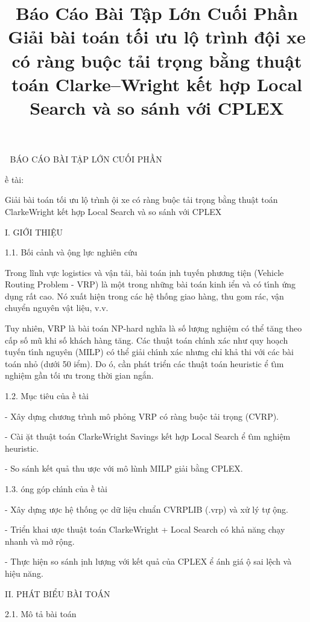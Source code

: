 \documentclass[12pt]{article}
\title{Báo Cáo Bài Tập Lớn Cuối Phần\\\large{Giải bài toán tối ưu lộ trình đội xe có ràng buộc tải trọng bằng thuật toán Clarke--Wright kết hợp Local Search và so sánh với CPLEX}}
\author{}
\date{}
\begin{document}
\maketitle
📘 B\'AO C\'AO B\`AI TẬP LỚN CUỐI PHẦN

{\DJ}ề t\`ai:

Giải b\`ai to\'an tối ưu lộ tr{\`\i}nh {\dj}ội xe c\'o r\`ang buộc tải trọng bằng thuật to\'an Clarke{\textendash}Wright kết hợp Local Search v\`a so s\'anh với CPLEX

I. GIỚI THIỆU

1.1. Bối cảnh v\`a {\dj}ộng lực nghi\^en cứu

Trong l\~{i}nh vực logistics v\`a vận tải, b\`ai to\'an {\dj}ịnh tuyến phương tiện (Vehicle Routing Problem - VRP) l\`a một trong những b\`ai to\'an kinh {\dj}iển v\`a c\'o t{\'\i}nh ứng dụng rất cao. N\'o xuất hiện trong c\'ac hệ thống giao h\`ang, thu gom r\'ac, vận chuyển nguy\^en vật liệu, v.v.

Tuy nhi\^en, VRP l\`a b\`ai to\'an NP-hard {\textemdash} ngh\~{i}a l\`a số lượng nghiệm c\'o thể t\u{a}ng theo cấp số m\~{u} khi số kh\'ach h\`ang t\u{a}ng. C\'ac thuật to\'an ch{\'\i}nh x\'ac như quy hoạch tuyến t{\'\i}nh nguy\^en (MILP) c\'o thể giải ch{\'\i}nh x\'ac nhưng chỉ khả thi với c\'ac b\`ai to\'an nhỏ (dưới 50 {\dj}iểm). Do {\dj}\'o, cần ph\'at triển c\'ac thuật to\'an heuristic {\dj}ể t{\`\i}m nghiệm gần tối ưu trong thời gian ngắn.

1.2. Mục ti\^eu của {\dj}ề t\`ai

- X\^ay dựng chương tr{\`\i}nh m\^o phỏng VRP c\'o r\`ang buộc tải trọng (CVRP).

- C\`ai {\dj}ặt thuật to\'an Clarke{\textendash}Wright Savings kết hợp Local Search {\dj}ể t{\`\i}m nghiệm heuristic.

- So s\'anh kết quả thu {\dj}ược với m\^o h{\`\i}nh MILP giải bằng CPLEX.

1.3. {\DJ}\'ong g\'op ch{\'\i}nh của {\dj}ề t\`ai

- X\^ay dựng {\dj}ược hệ thống {\dj}ọc dữ liệu chuẩn CVRPLIB (.vrp) v\`a xử l\'y tự {\dj}ộng.

- Triển khai {\dj}ược thuật to\'an Clarke{\textendash}Wright + Local Search c\'o khả n\u{a}ng chạy nhanh v\`a mở rộng.

- Thực hiện so s\'anh {\dj}ịnh lượng với kết quả của CPLEX {\dj}ể {\dj}\'anh gi\'a {\dj}ộ sai lệch v\`a hiệu n\u{a}ng.

II. PH\'AT BIỂU B\`AI TO\'AN

2.1. M\^o tả b\`ai to\'an
\end{document}
